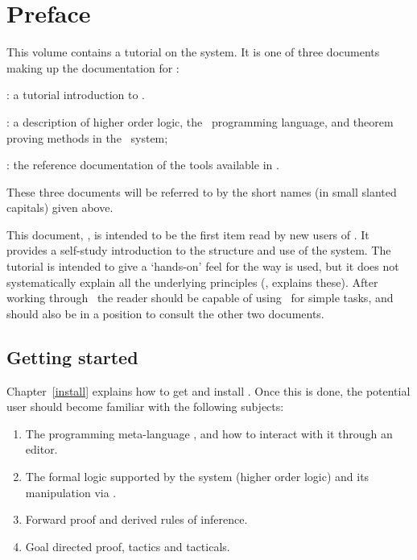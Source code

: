 \chapter*{Preface}
\label{intro}

This volume contains a tutorial on the \HOL{} system.  It is one of three
documents making up the documentation for \HOL:

\begin{myenumerate}
\item \TUTORIAL: a tutorial introduction to \HOL.
\item \DESCRIPTION: a description of higher order logic, the \ML\
  programming language, and theorem proving methods in the \HOL\
  system;
\item \REFERENCE: the reference documentation of the tools available
  in \HOL.
\end{myenumerate}

\noindent These three documents will be referred to by the short names (in
small slanted capitals) given above.

This document, \TUTORIAL, is intended to be the first item read by new
users of \HOL.  It provides a self-study introduction to the structure
and use of the system.  The tutorial is intended to give a `hands-on'
feel for the way \HOL{} is used, but it does not systematically explain
all the underlying principles (\DESCRIPTION, explains these).  After
working through \TUTORIAL\ the reader should be capable of using \HOL\
for simple tasks, and should also be in a position to consult the
other two documents.

\section*{Getting started}

Chapter~\ref{install} explains how to get and install \HOL.  Once this
is done, the potential \HOL{} user should become familiar with the
following subjects:

\begin{enumerate}
\item The programming meta-language \ML, and how to interact with it
  through an editor.
\item The formal logic supported by the \HOL{} system (higher order
  logic) and its manipulation via \ML.
\item Forward proof and derived rules of inference.
\item Goal directed proof, tactics and tacticals.
\end{enumerate}

